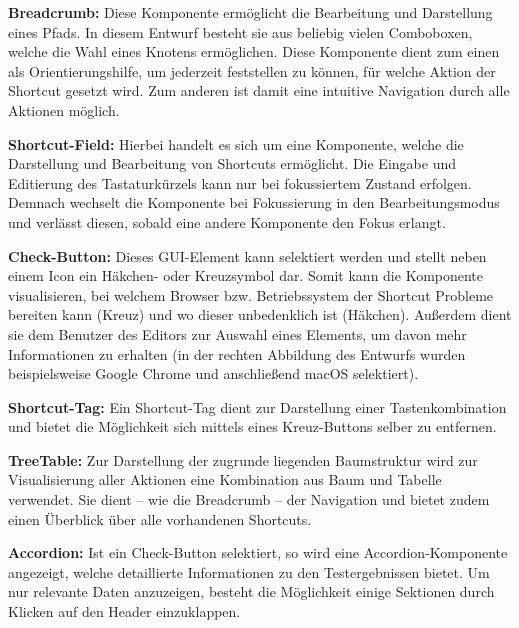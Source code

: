 \textbf{Breadcrumb:} Diese Komponente ermöglicht die Bearbeitung und Darstellung eines Pfads. In diesem Entwurf besteht sie aus beliebig vielen Comboboxen, welche die Wahl eines Knotens ermöglichen. Diese Komponente dient zum einen als Orientierungshilfe, um jederzeit feststellen zu können, für welche Aktion der Shortcut gesetzt wird. Zum anderen ist damit eine intuitive Navigation durch alle Aktionen möglich.

 \textbf{Shortcut-Field:} Hierbei handelt es sich um eine Komponente, welche die Darstellung und Bearbeitung von Shortcuts ermöglicht. Die Eingabe und Editierung des Tastaturkürzels kann nur bei fokussiertem Zustand erfolgen. Demnach wechselt die Komponente bei Fokussierung in den Bearbeitungsmodus und verlässt diesen, sobald eine andere Komponente den Fokus erlangt.

 \textbf{Check-Button:} Dieses GUI-Element kann selektiert werden und stellt neben einem Icon ein Häkchen- oder Kreuzsymbol dar. Somit kann die Komponente visualisieren, bei welchem Browser bzw. Betriebssystem der Shortcut Probleme bereiten kann (Kreuz) und wo dieser unbedenklich ist (Häkchen). Außerdem dient sie dem Benutzer des Editors zur Auswahl eines Elements, um davon mehr Informationen zu erhalten (in der rechten Abbildung des Entwurfs wurden beispielsweise Google Chrome und anschließend macOS selektiert).

 \textbf{Shortcut-Tag:} Ein Shortcut-Tag dient zur Darstellung einer Tastenkombination und bietet die Möglichkeit sich mittels eines Kreuz-Buttons selber zu entfernen.

 \textbf{TreeTable:} Zur Darstellung der zugrunde liegenden Baumstruktur wird zur Visualisierung aller Aktionen eine Kombination aus Baum und Tabelle verwendet. Sie dient -- wie die Breadcrumb -- der Navigation und bietet zudem einen Überblick über alle vorhandenen Shortcuts.

 \textbf{Accordion:} Ist ein Check-Button selektiert, so wird eine Accordion-Komponente angezeigt, welche detaillierte Informationen zu den Testergebnissen bietet. Um nur relevante Daten anzuzeigen, besteht die Möglichkeit einige Sektionen durch Klicken auf den Header einzuklappen.

\vfill

